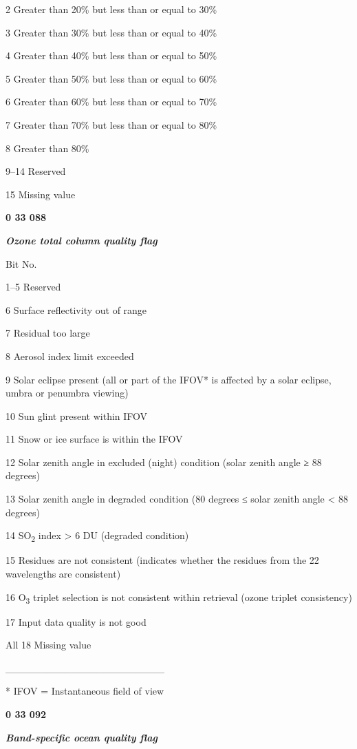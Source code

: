 2 Greater than 20\% but less than or equal to 30\%

3 Greater than 30\% but less than or equal to 40\%

4 Greater than 40\% but less than or equal to 50\%

5 Greater than 50\% but less than or equal to 60\%

6 Greater than 60\% but less than or equal to 70\%

7 Greater than 70\% but less than or equal to 80\%

8 Greater than 80\%

9--14 Reserved

15 Missing value

\textbf{0 33 088}

\emph{\textbf{Ozone total column quality flag}}

Bit No.

1--5 Reserved

6 Surface reflectivity out of range

7 Residual too large

8 Aerosol index limit exceeded

9 Solar eclipse present (all or part of the IFOV* is affected by a solar eclipse, umbra or penumbra viewing)

10 Sun glint present within IFOV

11 Snow or ice surface is within the IFOV

12 Solar zenith angle in excluded (night) condition (solar zenith angle ≥ 88 degrees)

13 Solar zenith angle in degraded condition (80 degrees ≤ solar zenith angle \textless{} 88 degrees)

14 SO\textsubscript{2} index \textgreater{} 6 DU (degraded condition)

15 Residues are not consistent (indicates whether the residues from the 22 wavelengths are consistent)

16 O\textsubscript{3} triplet selection is not consistent within retrieval (ozone triplet consistency)

17 Input data quality is not good

All 18 Missing value

\_\_\_\_\_\_\_\_\_\_\_\_\_\_\_\_\_\_\_\_\_\_

* IFOV = Instantaneous field of view

\textbf{0 33 092}

\emph{\textbf{Band-specific ocean quality flag}}

